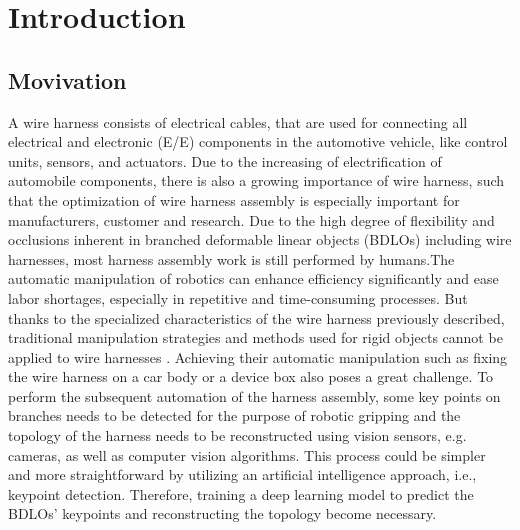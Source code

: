 \chapter{Introduction}
\section{Movivation}
    A wire harness consists of electrical cables, that are used for connecting all electrical and electronic (E/E) components in the automotive vehicle, like 
    control units, sensors, and actuators\cite{TROMMNAU2019387}\cite{NGUYEN2021379}. Due to the increasing of electrification of automobile components, 
    there is also a growing importance of wire harness, such that the optimization of wire harness assembly is especially important for manufacturers,
    customer and research\cite{HEISLER2021260}. Due to the high degree of flexibility and occlusions inherent in branched deformable linear objects (BDLOs) 
    including wire harnesses, most harness assembly work is still performed by humans\cite{10284109}.The automatic manipulation of robotics can enhance efficiency 
    significantly and ease labor shortages, especially in repetitive and time-consuming processes\cite{van2012automatic}.
    But thanks to the specialized characteristics of the wire harness previously described, traditional manipulation strategies and methods used for rigid objects 
    cannot be applied to wire harnesses \cite{9952859}.
    Achieving their automatic manipulation such as fixing the wire harness on a car body or a device box\cite{JIANG201552} also poses a great challenge.  
    To perform the subsequent automation of the harness assembly, some key points on branches needs to be detected for the purpose of robotic gripping and
    the topology of the harness needs to be reconstructed using vision sensors, e.g. cameras, as well as computer vision algorithms\cite{9195380}. 
    This process could be simpler and more straightforward by utilizing an artificial intelligence approach, i.e., keypoint detection\cite{8892980}. 
    Therefore, training a deep learning model to predict the BDLOs' keypoints and reconstructing the topology become necessary.
